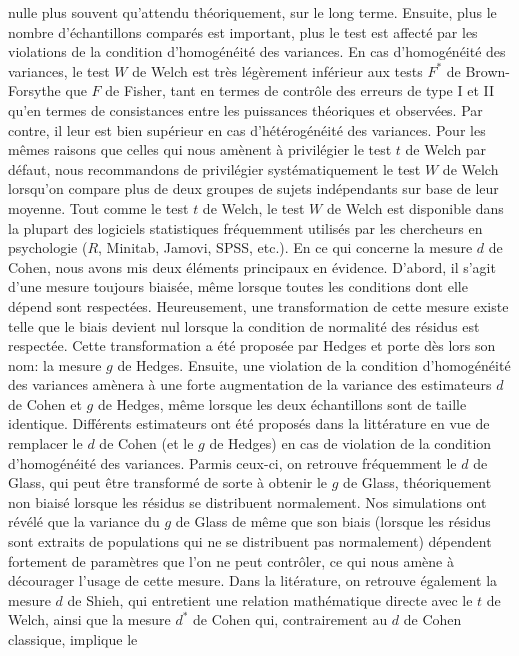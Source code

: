 \documentclass[
  12pt,
  french,
]{article}
\begin{document}
nulle plus souvent qu'attendu théoriquement, sur le long terme. Ensuite,
plus le nombre d'échantillons comparés est important, plus le test est
affecté par les violations de la condition d'homogénéité des variances.
En cas d'homogénéité des variances, le test \(W\) de Welch est très
légèrement inférieur aux tests \(F^*\) de Brown-Forsythe que \(F\) de
Fisher, tant en termes de contrôle des erreurs de type I et II qu'en
termes de consistances entre les puissances théoriques et observées. Par
contre, il leur est bien supérieur en cas d'hétérogénéité des variances.
Pour les mêmes raisons que celles qui nous amènent à privilégier le test
\(t\) de Welch par défaut, nous recommandons de privilégier
systématiquement le test \(W\) de Welch lorsqu'on compare plus de deux
groupes de sujets indépendants sur base de leur moyenne. Tout comme le
test \(t\) de Welch, le test \(W\) de Welch est disponible dans la
plupart des logiciels statistiques fréquemment utilisés par les
chercheurs en psychologie (\(R\), Minitab, Jamovi, SPSS, etc.). En ce
qui concerne la mesure \(d\) de Cohen, nous avons mis deux éléments
principaux en évidence. D'abord, il s'agit d'une mesure toujours
biaisée, même lorsque toutes les conditions dont elle dépend sont
respectées. Heureusement, une transformation de cette mesure existe
telle que le biais devient nul lorsque la condition de normalité des
résidus est respectée. Cette transformation a été proposée par Hedges et
porte dès lors son nom: la mesure \(g\) de Hedges. Ensuite, une
violation de la condition d'homogénéité des variances amènera à une
forte augmentation de la variance des estimateurs \(d\) de Cohen et
\(g\) de Hedges, même lorsque les deux échantillons sont de taille
identique. Différents estimateurs ont été proposés dans la littérature
en vue de remplacer le \(d\) de Cohen (et le \(g\) de Hedges) en cas de
violation de la condition d'homogénéité des variances. Parmis ceux-ci,
on retrouve fréquemment le \(d\) de Glass, qui peut être transformé de
sorte à obtenir le \(g\) de Glass, théoriquement non biaisé lorsque les
résidus se distribuent normalement. Nos simulations ont révélé que la
variance du \(g\) de Glass de même que son biais (lorsque les résidus
sont extraits de populations qui ne se distribuent pas normalement)
dépendent fortement de paramètres que l'on ne peut contrôler, ce qui
nous amène à décourager l'usage de cette mesure. Dans la litérature, on
retrouve également la mesure \(d\) de Shieh, qui entretient une relation
mathématique directe avec le \(t\) de Welch, ainsi que la mesure \(d^*\)
de Cohen qui, contrairement au \(d\) de Cohen classique, implique le
\end{document}

